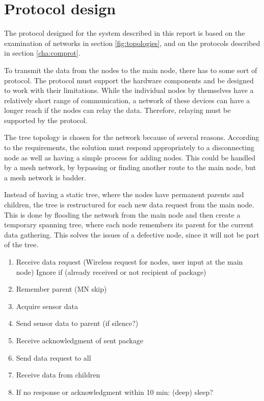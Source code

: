 \section{Protocol design}
The protocol designed for the system described in this report is based on the examination of networks in section \ref{fig:topologies}, and on the protocols described in section \ref{cha:comprot}.


To transmit the data from the nodes to the main node, there has to some sort of protocol. The protocol must support the hardware components and be designed to work with their limitations. While the individual nodes by themselves have a relatively short range of communication, a network of these devices can have a longer reach if the nodes can relay the data. Therefore, relaying must be supported by the protocol. 

The tree topology is chosen for the network because of several reasons. According to the requirements, the solution must respond appropriately to a disconnecting node as well as having a simple process for adding nodes. This could be handled by a mesh network, by bypassing or finding another route to the main node, but a mesh network  is badder. 

Instead of having a static tree, where the nodes have permanent parents and children, the tree is restructured for each new data request from the main node. This is done by flooding the network from the main node and then create a temporary spanning tree, where each node remembers its parent for the current data gathering. This solves the issues of a defective node, since it will not be part of the tree. 

\begin{enumerate}
	\item Receive data request (Wireless request for nodes, user input at the main node)
		\subitem Ignore if (already received or not recipient of package)
	\item Remember parent (MN skip)
	\item Acquire sensor data
	\item Send sensor data to parent (if silence?)
	\item Receive acknowledgment of sent package
	\item Send data request to all
	\item Receive data from children
	\item If no response or acknowledgment within 10 min: (deep) sleep?
\end{enumerate}

